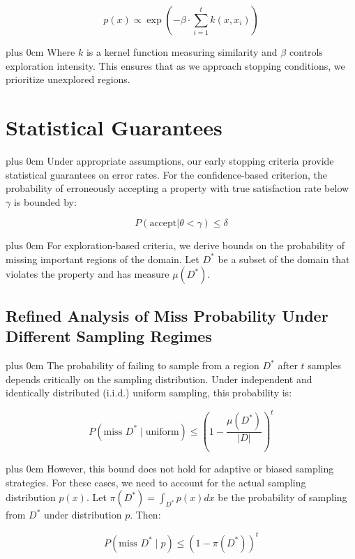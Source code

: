 \documentclass[11pt,a4paper]{article}
\newcommand{\justifytext}{\leftskip=0pt \rightskip=0pt plus 0cm}
\begin{document}
\begin{equation}
p(x) \propto \exp\left(-\beta \cdot \sum_{i=1}^t k(x, x_i)\right)
\end{equation}

\justifytext
Where $k$ is a kernel function measuring similarity and $\beta$ controls exploration intensity. This ensures that as we approach stopping conditions, we prioritize unexplored regions.

\section{Statistical Guarantees}

\justifytext
Under appropriate assumptions, our early stopping criteria provide statistical guarantees on error rates. For the confidence-based criterion, the probability of erroneously accepting a property with true satisfaction rate below $\gamma$ is bounded by:

\begin{equation}
P(\text{accept} | \theta < \gamma) \leq \delta
\end{equation}

\justifytext
For exploration-based criteria, we derive bounds on the probability of missing important regions of the domain. Let $D^*$ be a subset of the domain that violates the property and has measure $\mu(D^*)$. 

\subsection{Refined Analysis of Miss Probability Under Different Sampling Regimes}

\justifytext
The probability of failing to sample from a region $D^*$ after $t$ samples depends critically on the sampling distribution. Under independent and identically distributed (i.i.d.) uniform sampling, this probability is:

\begin{equation}
P(\text{miss } D^* \mid \text{uniform}) \leq \left(1 - \frac{\mu(D^*)}{|D|}\right)^t
\end{equation}

\justifytext
However, this bound does not hold for adaptive or biased sampling strategies. For these cases, we need to account for the actual sampling distribution $p(x)$. Let $\pi(D^*) = \int_{D^*} p(x) dx$ be the probability of sampling from $D^*$ under distribution $p$. Then:

\begin{equation}
P(\text{miss } D^* \mid p) \leq (1 - \pi(D^*))^t
\end{equation}
\end{document}
